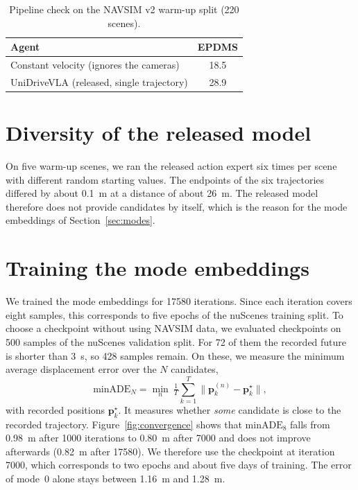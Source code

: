\documentclass[11pt, a4paper, oneside]{book}
\begin{document}
\begin{table}[ht]
\centering
\caption[Pipeline check on the warm-up split]{Pipeline check on the NAVSIM v2 warm-up split
(220 scenes).}
\label{tab:prelim}
\begin{tabular}{lc}
\toprule
Agent & EPDMS \\
\midrule
Constant velocity (ignores the cameras) & 18.5 \\
UniDriveVLA (released, single trajectory) & 28.9 \\
\bottomrule
\end{tabular}
\end{table}

\section{Diversity of the released model}
\label{sec:diversity}
On five warm-up scenes, we ran the released action expert six times per scene with different
random starting values. The endpoints of the six trajectories differed by about
\SI{0.1}{\metre} at a distance of about \SI{26}{\metre}. The released model therefore does not
provide candidates by itself, which is the reason for the mode embeddings of
Section~\ref{sec:modes}.

\section{Training the mode embeddings}
\label{sec:modesresult}
We trained the mode embeddings for \num{17580} iterations. Since each iteration covers eight
samples, this corresponds to five epochs of the nuScenes training split. To choose a checkpoint
without using NAVSIM data, we evaluated checkpoints on 500 samples of the nuScenes validation
split. For 72 of them the recorded future is shorter than \SI{3}{\second}, so 428 samples
remain. On these, we measure the minimum average displacement error over the $N$ candidates,
\begin{equation}
  \mathrm{minADE}_N=\min_{n}\ \tfrac{1}{T}\textstyle\sum_{k=1}^{T}\big\lVert\mathbf{p}^{(n)}_k-\mathbf{p}^{\star}_k\big\rVert,
\end{equation}
with recorded positions $\mathbf{p}^{\star}_k$. It measures whether \emph{some} candidate is
close to the recorded trajectory.
Figure~\ref{fig:convergence} shows that $\mathrm{minADE}_8$ falls from \SI{0.98}{\metre} after
\num{1000} iterations to \SI{0.80}{\metre} after \num{7000} and does not improve afterwards
(\SI{0.82}{\metre} after \num{17580}). We therefore use the checkpoint at iteration \num{7000},
which corresponds to two epochs and about five days of training. The error of mode~0 alone stays
between \SI{1.16}{\metre} and \SI{1.28}{\metre}.
\end{document}
